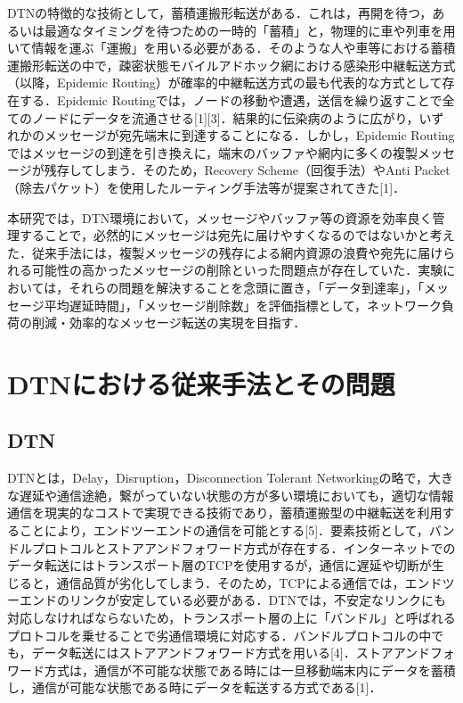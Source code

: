 \documentclass[11pt]{icsthesis}
\begin{document}
DTNの特徴的な技術として，蓄積運搬形転送がある．これは，再開を待つ，あるいは最適なタイミングを待つための一時的「蓄積」と，物理的に車や列車を用いて情報を運ぶ「運搬」を用いる必要がある．そのような人や車等における蓄積運搬形転送の中で，疎密状態モバイルアドホック網における感染形中継転送方式（以降，Epidemic Routing）が確率的中継転送方式の最も代表的な方式として存在する．Epidemic Routingでは，ノードの移動や遭遇，送信を繰り返すことで全てのノードにデータを流通させる[1][3]．結果的に伝染病のように広がり，いずれかのメッセージが宛先端末に到達することになる．しかし，Epidemic Routingではメッセージの到達を引き換えに，端末のバッファや網内に多くの複製メッセージが残存してしまう．そのため，Recovery Scheme（回復手法）やAnti Packet（除去パケット）を使用したルーティング手法等が提案されてきた[1]．

本研究では，DTN環境において，メッセージやバッファ等の資源を効率良く管理することで，必然的にメッセージは宛先に届けやすくなるのではないかと考えた．従来手法には，複製メッセージの残存による網内資源の浪費や宛先に届けられる可能性の高かったメッセージの削除といった問題点が存在していた．実験においては，それらの問題を解決することを念頭に置き，「データ到達率」，「メッセージ平均遅延時間」，「メッセージ削除数」を評価指標として，ネットワーク負荷の削減・効率的なメッセージ転送の実現を目指す．

\chapter{DTNにおける従来手法とその問題}
\section{DTN}
DTNとは，Delay，Disruption，Disconnection Tolerant Networkingの略で，大きな遅延や通信途絶，繋がっていない状態の方が多い環境においても，適切な情報通信を現実的なコストで実現できる技術であり，蓄積運搬型の中継転送を利用することにより，エンドツーエンドの通信を可能とする[5]．要素技術として，バンドルプロトコルとストアアンドフォワード方式が存在する．インターネットでのデータ転送にはトランスポート層のTCPを使用するが，通信に遅延や切断が生じると，通信品質が劣化してしまう．そのため，TCPによる通信では，エンドツーエンドのリンクが安定している必要がある．DTNでは，不安定なリンクにも対応しなければならないため，トランスポート層の上に「バンドル」と呼ばれるプロトコルを乗せることで劣通信環境に対応する．バンドルプロトコルの中でも，データ転送にはストアアンドフォワード方式を用いる[4]．ストアアンドフォワード方式は，通信が不可能な状態である時には一旦移動端末内にデータを蓄積し，通信が可能な状態である時にデータを転送する方式である[1]．
\end{document}
